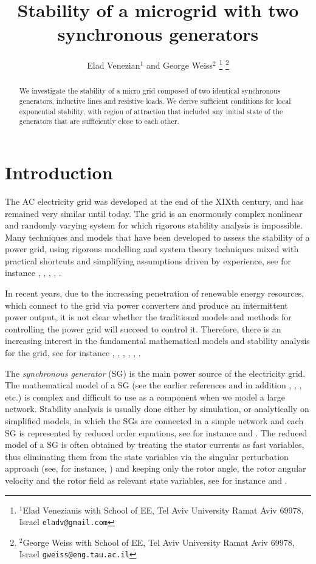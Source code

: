 \documentclass[letterpaper, 10 pt, conference]{ieeeconf}  %
\title{\LARGE \bf
Stability of a microgrid with two synchronous generators 
}
\author{Elad Venezian$^{1}$ and George Weiss$^{2}$%
\thanks{$^{1}$Elad Venezianis with School of EE,
        Tel Aviv University Ramat Aviv 69978, Israel
        {\tt\small eladv@gmail.com}}%
\thanks{$^{2}$George Weiss with School of EE,
        Tel Aviv University Ramat Aviv 69978, Israel
        {\tt\small gweiss@eng.tau.ac.il}}%
}
\begin{document}
\maketitle
\thispagestyle{empty}
\pagestyle{empty}


\begin{abstract}

We investigate the stability of a micro grid composed of two identical synchronous generators, inductive lines and resistive loads. We derive sufficient conditions for local exponential stability, with region of attraction that included any initial state of the generators that are sufficiently close to each other. 

\end{abstract}


\section{Introduction}

The AC electricity grid was developed at the end of the XIXth century,
and has remained very similar until today. The grid is an enormously
complex nonlinear and randomly varying system for which rigorous
stability analysis is impossible. Many techniques and models that have
been developed to assess the stability of a power grid, using rigorous
modelling and system theory techniques mixed with practical shortcuts
and simplifying assumptions driven by experience, see for instance
\cite{Kundur}, \cite{GrSt2014}, \cite{SauerPai1998}, \cite{GOBS:03},
\cite{DoBull:12}.

In recent years, due to the increasing penetration of renewable energy
resources, which connect to the grid via power converters and produce
an intermittent power output, it is not clear whether the traditional
models and methods for controlling the power grid will succeed to
control it. Therefore, there is an increasing interest in the
fundamental mathematical models and stability analysis for the grid,
see for instance \cite{DoBull:12}, \cite{PoDoBu:13}, \cite{CaTa:14},
\cite{NaWe:14}, \cite{NaWe:15}, \cite{DePersiSchaft:16}.

The {\em synchronous generator} (SG) is the main power source of the
electricity grid. The mathematical model of a SG (see the earlier
references and in addition \cite{Walker:94}, \cite{Fitzgerald:03},
\cite{MaWe:15}, etc.) is complex and difficult to use as a component
when we model a large network. Stability analysis is usually done
either by simulation, or analytically on simplified models, in which
the SGs are connected in a simple network and each SG is represented
by reduced order equations, see for instance \cite{DoBull:12} and
\cite{PoDoBu:13}. The reduced model of a SG is often obtained by
treating the stator currents as fast variables, thus eliminating them
from the state variables via the singular perturbation approach (see,
for instance, \cite{Khalil}) and keeping only the rotor angle, the
rotor angular velocity and the rotor field as relevant state
variables, see for instance \cite{Kundur} and \cite{SauerPai1998}.
\end{document}
